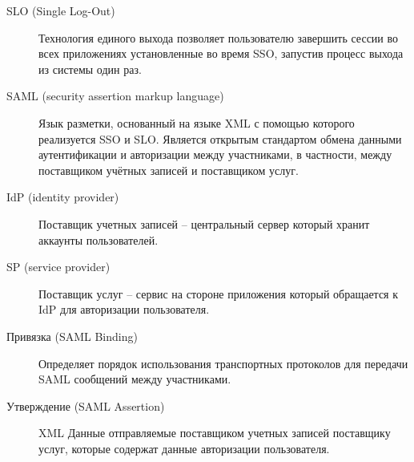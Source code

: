 \begin{description}
\item[SLO (Single Log-Out)] Технология единого выхода позволяет пользователю завершить сессии во всех приложениях установленные во время SSO, запустив процесс выхода из системы один раз.
\item[SAML (security assertion markup language)] Язык разметки, основанный на языке XML с помощью которого реализуется SSO и SLO. Является открытым стандартом обмена данными аутентификации и авторизации между участниками, в частности, между поставщиком учётных записей и поставщиком услуг.
\item[IdP (identity provider)] Поставщик учетных записей – центральный сервер который хранит аккаунты пользователей.
\item[SP (service provider)] Поставщик услуг – сервис на стороне приложения который обращается к IdP для авторизации пользователя.
\item[Привязка (SAML Binding)] Определяет порядок использования транспортных протоколов для передачи SAML сообщений между участниками.
\item[Утверждение (SAML Assertion)] XML Данные отправляемые поставщиком учетных записей поставщику услуг, которые содержат данные авторизации пользователя.
\end{description}

